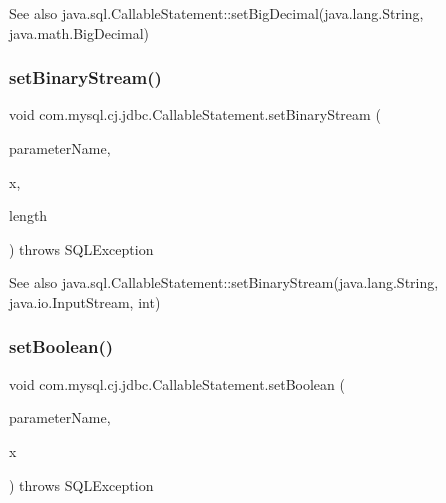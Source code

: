 \begin{DoxySeeAlso}{See also}
java.\+sql.\+Callable\+Statement\+::set\+Big\+Decimal(java.\+lang.\+String, java.\+math.\+Big\+Decimal) 
\end{DoxySeeAlso}
\mbox{\label{classcom_1_1mysql_1_1cj_1_1jdbc_1_1_callable_statement_a2cb01ff3839a5512f641ad8ffc72adaa}} 
\subsubsection{\texorpdfstring{set\+Binary\+Stream()}{setBinaryStream()}}
{\footnotesize\ttfamily void com.\+mysql.\+cj.\+jdbc.\+Callable\+Statement.\+set\+Binary\+Stream (\begin{DoxyParamCaption}\item[{String}]{parameter\+Name,  }\item[{Input\+Stream}]{x,  }\item[{int}]{length }\end{DoxyParamCaption}) throws S\+Q\+L\+Exception}

\begin{DoxySeeAlso}{See also}
java.\+sql.\+Callable\+Statement\+::set\+Binary\+Stream(java.\+lang.\+String, java.\+io.\+Input\+Stream, int) 
\end{DoxySeeAlso}
\mbox{\label{classcom_1_1mysql_1_1cj_1_1jdbc_1_1_callable_statement_a8236f80a9a498f1401ee0f2ec01adcdd}} 
\subsubsection{\texorpdfstring{set\+Boolean()}{setBoolean()}}
{\footnotesize\ttfamily void com.\+mysql.\+cj.\+jdbc.\+Callable\+Statement.\+set\+Boolean (\begin{DoxyParamCaption}\item[{String}]{parameter\+Name,  }\item[{boolean}]{x }\end{DoxyParamCaption}) throws S\+Q\+L\+Exception}

